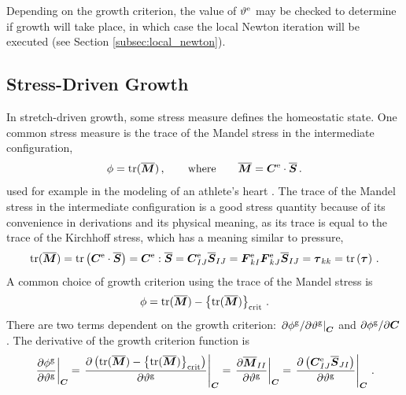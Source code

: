 \documentclass[10pt,letterpaper,oneside]{report}
\newcommand{\ten}[1]{\mbox{\boldmath $#1$}{}}
\newcommand{\scas}[1]{\mbox{{\scriptsize{${\rm{#1}}$}}}{}}
\newcommand{\tens}[1]{\mbox{\boldmath{\scriptsize{$#1$}}}{}}
\begin{document}
Depending on the growth criterion, the value of $\vartheta^{\scas{e}}$ may be checked to determine if growth will take place, in which case the local Newton iteration will be executed (see Section \ref{subsec:local_newton}).


\subsection{Stress-Driven Growth}
In stretch-driven growth, some stress measure defines the homeostatic state.  One common stress measure is the trace of the Mandel stress in the intermediate configuration, 
\begin{equation}
\phi = \mbox{tr} ( \overline{\ten{M}} ) \, , 
\qquad \mbox{where} \qquad
\overline{\ten{M}} = \ten{C}^{\scas{e}} \cdot \overline{\ten{S}} \, . 
\label{def_Mandel}
\end{equation}
used for example in the modeling of an athlete's heart \cite{Goktepe2010}.  The trace of the Mandel stress in the intermediate configuration is a good stress quantity because of its convenience in derivations and its physical meaning, as its trace is equal to the trace of the Kirchhoff stress, which has a meaning similar to pressure, 
\begin{equation}
\mbox{tr} (\overline{\ten{M}} ) = \mbox{tr} \left( \ten{C}^{\scas{e}} \cdot \overline{\ten{S}} \right) =  \ten{C}^{\scas{e}} : \overline{\ten{S}} =  \ten{C}^{\scas{e}}_{IJ} \overline{\ten{S}}_{IJ} = \ten{F}^{\scas{e}}_{kI} \ten{F}^{\scas{e}}_{kJ} \overline{\ten{S}}_{IJ} = \ten{\tau}_{kk} = \mbox{tr} \left( \ten{\tau} \right) \, . 
\end{equation}
A common choice of growth criterion using the trace of the Mandel stress is 
\begin{equation}
\phi = \mbox{tr} ( \overline{\ten{M}} ) - \left\lbrace \mbox{tr} ( \overline{\ten{M}} ) \right\rbrace_{\scas{crit}} \, . 
\label{growth_criterion_Mandel}
\end{equation}
There are two terms dependent on the growth criterion: $ \left. \partial \phi^{\scas{g}} / \partial \vartheta^{\scas{g}} \right|_{\tens{C}} $ and $ \partial \phi^{\scas{g}} / \partial \ten{C} $.  The derivative of the growth criterion function is  
\begin{equation}
\left. \frac{\partial \phi^{\scas{g}}}{\partial \vartheta^{\scas{g}}} \right|_{\tens{C}}
= \left. \frac{\partial \left( \mbox{tr} (\overline{\ten{M}}) - \left\lbrace \mbox{tr} (\overline{\ten{M}} )\right\rbrace_{\scas{crit}} \right)}{\partial \vartheta^{\scas{g}}} \right|_{\tens{C}}
= \left. \frac{\partial \overline{\ten{M}}_{II} }{\partial \vartheta^{\scas{g}}} \right|_{\tens{C}} 
= \left. \frac{ \partial \left( \ten{C}^{\scas{e}}_{IJ} \overline{\ten{S}}_{JI} \right)}{\partial \vartheta^{\scas{g}}} \right|_{\tens{C}} \, . 
\end{equation}
\end{document}
